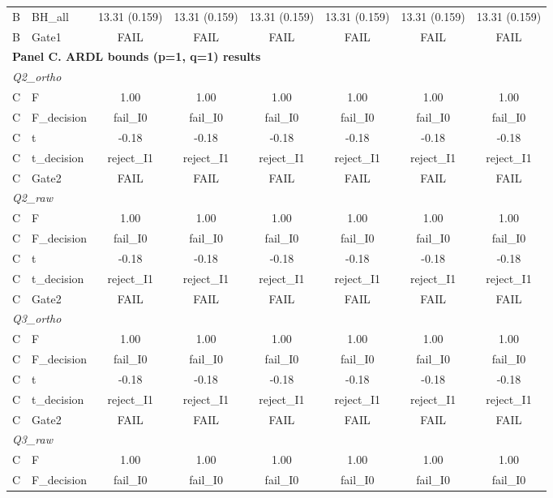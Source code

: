 \begin{table}[!ht]
\begin{tabular}{ll|cc|cc|cc}
\\
B & BH\_all & 13.31 (0.159) & 13.31 (0.159) & 13.31 (0.159) & 13.31 (0.159) & 13.31 (0.159) & 13.31 (0.159)
\\
B & Gate1 & FAIL & FAIL & FAIL & FAIL & FAIL & FAIL
\\
\hline
\multicolumn{8}{l}{\textbf{Panel C. ARDL bounds (p=1, q=1) results}}\\
\hline
\multicolumn{8}{l}{\textit{Q2\_ortho}}\\
C & F & 1.00 & 1.00 & 1.00 & 1.00 & 1.00 & 1.00
\\
C & F\_decision & fail\_I0 & fail\_I0 & fail\_I0 & fail\_I0 & fail\_I0 & fail\_I0
\\
C & t & -0.18 & -0.18 & -0.18 & -0.18 & -0.18 & -0.18
\\
C & t\_decision & reject\_I1 & reject\_I1 & reject\_I1 & reject\_I1 & reject\_I1 & reject\_I1
\\
C & Gate2 & FAIL & FAIL & FAIL & FAIL & FAIL & FAIL
\\
\hline
\multicolumn{8}{l}{\textit{Q2\_raw}}\\
C & F & 1.00 & 1.00 & 1.00 & 1.00 & 1.00 & 1.00
\\
C & F\_decision & fail\_I0 & fail\_I0 & fail\_I0 & fail\_I0 & fail\_I0 & fail\_I0
\\
C & t & -0.18 & -0.18 & -0.18 & -0.18 & -0.18 & -0.18
\\
C & t\_decision & reject\_I1 & reject\_I1 & reject\_I1 & reject\_I1 & reject\_I1 & reject\_I1
\\
C & Gate2 & FAIL & FAIL & FAIL & FAIL & FAIL & FAIL
\\
\hline
\multicolumn{8}{l}{\textit{Q3\_ortho}}\\
C & F & 1.00 & 1.00 & 1.00 & 1.00 & 1.00 & 1.00
\\
C & F\_decision & fail\_I0 & fail\_I0 & fail\_I0 & fail\_I0 & fail\_I0 & fail\_I0
\\
C & t & -0.18 & -0.18 & -0.18 & -0.18 & -0.18 & -0.18
\\
C & t\_decision & reject\_I1 & reject\_I1 & reject\_I1 & reject\_I1 & reject\_I1 & reject\_I1
\\
C & Gate2 & FAIL & FAIL & FAIL & FAIL & FAIL & FAIL
\\
\hline
\multicolumn{8}{l}{\textit{Q3\_raw}}\\
C & F & 1.00 & 1.00 & 1.00 & 1.00 & 1.00 & 1.00
\\
C & F\_decision & fail\_I0 & fail\_I0 & fail\_I0 & fail\_I0 & fail\_I0 & fail\_I0
\\

\end{tabular}
\end{table}
